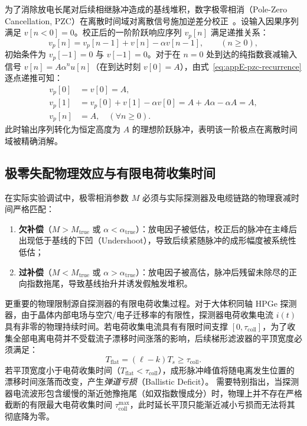 为了消除放电长尾对后续相继脉冲造成的基线堆积，数字极零相消（Pole-Zero Cancellation, PZC）在离散时间域对离散信号施加逆差分校正~\cite{wu-hongyi-2020-general-purpose-digital-daq-thesis, wu-2021-general-purpose-digital-daq-waveform-analysis}。设输入因果序列满足 $v[n < 0] = 0$。校正后的一阶阶跃响应序列 $v_p[n]$ 满足递推关系：
\begin{equation}\label{eq:appE-pzc-recurrence}
v_p[n] = v_p[n-1] + v[n] - \alpha v[n-1], \qquad (n \ge 0),
\end{equation}
初始条件为 $v_p[-1] = 0$ 与 $v[-1] = 0$。对于在 $n=0$ 处到达的纯指数衰减输入信号 $v[n] = A \alpha^n u[n]$（在到达时刻 $v[0] = A$），由式~\eqref{eq:appE-pzc-recurrence}逐点递推可知：
\begin{align}
v_p[0] &= v[0] = A, \nonumber \\
v_p[1] &= v_p[0] + v[1] - \alpha v[0] = A + A\alpha - \alpha A = A, \nonumber \\
v_p[n] &= A, \quad (\forall n \ge 0).
\end{align}
此时输出序列转化为恒定高度为 $A$ 的理想阶跃脉冲，表明该一阶极点在离散时间域被精确消解。

\subsection{极零失配物理效应与有限电荷收集时间}

在实际实验调试中，极零相消参数 $M$ 必须与实际探测器及电缆链路的物理衰减时间严格匹配：
\begin{enumerate}
\item \textbf{欠补偿}（$M > M_{\mathrm{true}}$ 或 $\alpha < \alpha_{\mathrm{true}}$）：放电因子被低估，校正后的脉冲在主峰后出现低于基线的下凹（Undershoot），导致后续紧随脉冲的成形幅度被系统性低估；
\item \textbf{过补偿}（$M < M_{\mathrm{true}}$ 或 $\alpha > \alpha_{\mathrm{true}}$）：放电因子被高估，脉冲后残留未除尽的正向指数拖尾，导致基线抬升并诱发假触发堆积。
\end{enumerate}

更重要的物理限制源自探测器的有限电荷收集过程。对于大体积同轴 HPGe 探测器，由于晶体内部电场与空穴/电子迁移率的有限性，探测器电荷收集电流 $i(t)$ 具有非零的物理持续时间。若电荷收集电流具有有限时间支撑 $[0, \tau_{\mathrm{coll}}]$，为了收集全部电离电荷并不受载流子漂移时间涨落的影响，后续梯形滤波器的平顶宽度必须满足：
\begin{equation}\label{eq:appE-flat-top-ballistic-cond}
T_{\mathrm{flat}} = (\ell - k) T_s \ge \tau_{\mathrm{coll}}.
\end{equation}
若平顶宽度小于电荷收集时间（$T_{\mathrm{flat}} < \tau_{\mathrm{coll}}$），成形脉冲峰值将随电离发生位置的漂移时间涨落而改变，产生\emph{弹道亏损}（Ballistic Deficit）。
需要特别指出，当探测器电流波形包含缓慢的渐近弛豫拖尾（如双指数慢成分）时，物理上并不存在严格截断的有限最大电荷收集时间 $\tau_{\mathrm{coll}}^{\max}$，此时延长平顶只能渐近减小亏损而无法将其彻底降为零。


